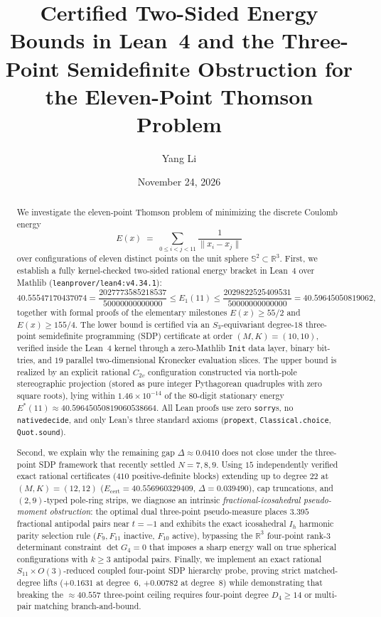 \documentclass[11pt,reqno]{amsart}
\title[Certified Bounds and Three-Point Obstruction for Thomson \texorpdfstring{$N = 11$}{N = 11}]{%
Certified Two-Sided Energy Bounds in Lean~4 and the Three-Point Semidefinite Obstruction for the Eleven-Point Thomson Problem}
\author{Yang Li}
\date{November 24, 2026}
\renewcommand{\_}{\origunderscore\allowbreak}
\theoremstyle{definition}
\newcommand{\R}{\mathbb{R}}
\newcommand{\Sph}{\mathbb{S}^2}
\newcommand{\norm}[1]{\lVert #1 \rVert}
\begin{document}
\begin{abstract}
We investigate the eleven-point Thomson problem of minimizing the discrete Coulomb energy
\[
  E(x) \;=\; \sum_{0 \le i < j < 11} \frac{1}{\norm{x_i - x_j}}
\]
over configurations of eleven distinct points on the unit sphere $\Sph \subset \R^3$.
First, we establish a fully kernel-checked two-sided rational energy bracket in Lean~4 over Mathlib (\texttt{leanprover/lean4:v4.34.1}):
\[
  40.55547170437074 = \frac{2027773585218537}{50000000000000}
  \le E_1(11) \le
  \frac{2029822525409531}{50000000000000} = 40.59645050819062,
\]
together with formal proofs of the elementary milestones $E(x) \ge 55/2$ and $E(x) \ge 155/4$.
The lower bound is certified via an $S_3$-equivariant degree-$18$ three-point semidefinite programming (SDP) certificate at order $(M,K) = (10,10)$, verified inside the Lean~4 kernel through a zero-Mathlib \texttt{Init} data layer, binary bit-tries, and $19$ parallel two-dimensional Kronecker evaluation slices.
The upper bound is realized by an explicit rational $C_{2v}$ configuration constructed via north-pole stereographic projection (stored as pure integer Pythagorean quadruples with zero square roots), lying within $1.46 \times 10^{-14}$ of the $80$-digit stationary energy $E^*(11) \approx 40.59645050819060538664$.
All Lean proofs use zero \texttt{sorry}s, no \texttt{native\_decide}, and only Lean's three standard axioms (\texttt{propext}, \texttt{Classical.choice}, \texttt{Quot.sound}).

Second, we explain why the remaining gap $\Delta \approx 0.0410$ does not close under the three-point SDP framework that recently settled $N = 7, 8, 9$.
Using $15$ independently verified exact rational certificates ($410$ positive-definite blocks) extending up to degree $22$ at $(M,K)=(12,12)$ ($E_{\mathrm{cert}} = 40.556960329409$, $\Delta = 0.039490$), cap truncations, and $(2,9)$-typed pole-ring strips, we diagnose an intrinsic \emph{fractional-icosahedral pseudo-moment obstruction}: the optimal dual three-point pseudo-measure places $3.395$ fractional antipodal pairs near $t = -1$ and exhibits the exact icosahedral $I_h$ harmonic parity selection rule ($F_9, F_{11}$ inactive, $F_{10}$ active), bypassing the $\R^3$ four-point rank-$3$ determinant constraint $\det G_4 = 0$ that imposes a sharp energy wall on true spherical configurations with $k \ge 3$ antipodal pairs.
Finally, we implement an exact rational $S_{11} \times O(3)$-reduced coupled four-point SDP hierarchy probe, proving strict matched-degree lifts ($+0.1631$ at degree~$6$, $+0.00782$ at degree~$8$) while demonstrating that breaking the $\approx 40.557$ three-point ceiling requires four-point degree $D_4 \ge 14$ or multi-pair matching branch-and-bound.
\end{abstract}
\end{document}

